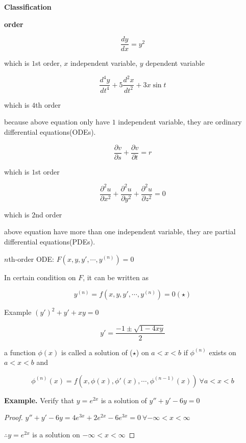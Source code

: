 


\cfoot{\thepage} %


\textbf{Classification}
\begin{tcolorbox}
	\textbf{order}

	$$\dfrac{dy}{dx} = y^2$$
	
	which is $1$st order,  $x$ independent variable, $y$ dependent variable
	
	$$\dfrac{d^4y}{dt^4} + 5\dfrac{d^2x}{dt^2} + 3x \sin{t}$$
	
	which is $4$th order
	
	because above equation only have $1$ independent variable, they are ordinary differential equations(ODEs).
	
	$$\dfrac{\partial v}{\partial s} + \dfrac{\partial v}{\partial t} = r$$
	
	which is $1$st order
	
	$$\dfrac{\partial^2 u}{\partial x^2} + \dfrac{\partial^2 u}{\partial y^2} + \dfrac{\partial^2 u}{\partial z^2} = 0$$
	
	which is $2$nd order
	
	above equation have more than one independent variable, they are partial differential equations(PDEs).
\end{tcolorbox}

$n$th-order ODE: $F(x,y,y',\cdots,y^{(n)}) = 0$

In certain condition on $F$, it can be written as

$$y^{(n)} = f(x,y,y',\cdots,y^{(n)}) = 0 (\star)$$

Example $(y')^2 + y' + xy = 0$

$$y' = \dfrac{-1 \pm \sqrt{1 - 4xy}}{2}$$

\begin{defn}
	a function $\phi(x)$ is called a solution of ($\star$) on $a<x<b$ if $\phi^{(n)}$ exists on $a<x<b$ and 
	
	$$\phi^{(n)}(x) = f(x,\phi (x),\phi'(x),\cdots,\phi^{(n-1)}(x) )~\forall a<x<b$$
\end{defn}

\textbf{Example.} Verify that $y = e^{2x}$ is a solution of $y'' + y' - 6y = 0$

\begin{proof}
	$y''+y' - 6y = 4e^{3x} + 2e^{2x} - 6e^{3x} = 0 ~\forall -\infty < x < \infty$
	
	$\therefore y = e^{2x}$ is a solution on $-\infty < x < \infty$
\end{proof}

